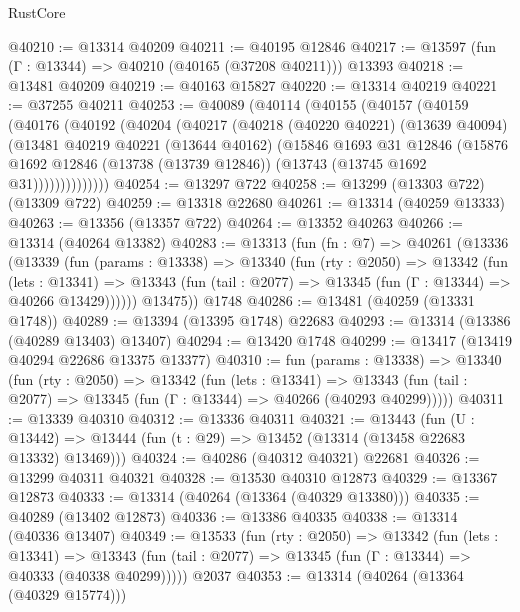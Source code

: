 \begin{lexlean}{RustCore}
\begin{coremodule}
@40210 := @13314 @40209
@40211 := @40195 @12846
@40217 := @13597 (fun (Γ : @13344) => @40210 (@40165 (@37208 @40211))) @13393
@40218 := @13481 @40209
@40219 := @40163 @15827
@40220 := @13314 @40219
@40221 := @37255 @40211
@40253 := @40089
    (@40114
      (@40155
        (@40157
          (@40159
            (@40176
              (@40192
                (@40204
                  (@40217
                    (@40218
                      (@40220 @40221)
                      (@13639 @40094)
                      (@13481
                        @40219
                        @40221
                        (@13644 @40162)
                        (@15846
                          @1693
                          @31
                          @12846
                          (@15876
                            @1692
                            @12846
                            (@13738 (@13739 @12846))
                            (@13743 (@13745 @1692 @31))))))))))))))
@40254 := @13297 @722
@40258 := @13299 (@13303 @722) (@13309 @722)
@40259 := @13318 @22680
@40261 := @13314 (@40259 @13333)
@40263 := @13356 (@13357 @722)
@40264 := @13352 @40263
@40266 := @13314 (@40264 @13382)
@40283 := @13313
    (fun (fn : @7) =>
    @40261
      (@13336
        (@13339
          (fun (params : @13338) =>
          @13340
            (fun (rty : @2050) =>
            @13342
              (fun (lets : @13341) =>
              @13343 (fun (tail : @2077) => @13345 (fun (Γ : @13344) => @40266 @13429))))))
        @13475))
    @1748
@40286 := @13481 (@40259 (@13331 @1748))
@40289 := @13394 (@13395 @1748) @22683
@40293 := @13314 (@13386 (@40289 @13403) @13407)
@40294 := @13420 @1748
@40299 := @13417 (@13419 @40294 @22686 @13375 @13377)
@40310 := fun (params : @13338) =>
  @13340
    (fun (rty : @2050) =>
    @13342
      (fun (lets : @13341) =>
      @13343 (fun (tail : @2077) => @13345 (fun (Γ : @13344) => @40266 (@40293 @40299)))))
@40311 := @13339 @40310
@40312 := @13336 @40311
@40321 := @13443
    (fun (U : @13442) => @13444 (fun (t : @29) => @13452 (@13314 (@13458 @22683 @13332) @13469)))
@40324 := @40286 (@40312 @40321) @22681
@40326 := @13299 @40311 @40321
@40328 := @13530 @40310 @12873
@40329 := @13367 @12873
@40333 := @13314 (@40264 (@13364 (@40329 @13380)))
@40335 := @40289 (@13402 @12873)
@40336 := @13386 @40335
@40338 := @13314 (@40336 @13407)
@40349 := @13533
    (fun (rty : @2050) =>
    @13342
      (fun (lets : @13341) =>
      @13343 (fun (tail : @2077) => @13345 (fun (Γ : @13344) => @40333 (@40338 @40299)))))
    @2037
@40353 := @13314 (@40264 (@13364 (@40329 @15774)))

\end{coremodule}
\end{lexlean}
